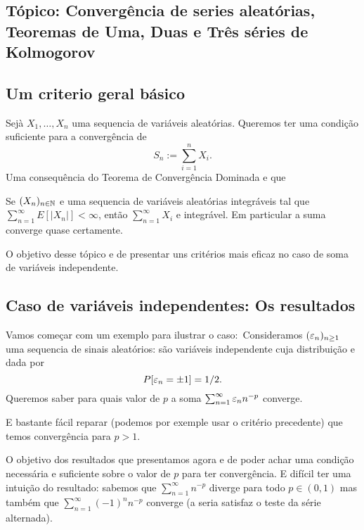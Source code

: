 \newpage
\begin{topics}
\section[Tópico:Séries de Kolmogorov]{Tópico: Convergência de series aleatórias,\\
Teoremas de Uma, Duas e Três séries de Kolmogorov}


\subsection{Um criterio geral básico}

Sejà $X_1,\dots, X_n$ uma sequencia de variáveis aleatórias.
Queremos ter uma condição suficiente para a convergência de 
\begin{equation}
S_n:= \sum_{i=1}^n X_i.
\end{equation}
Uma consequência do Teorema de Convergência Dominada e que 
\begin{lemma}
 Se $(X_n)_{n\in {\ensuremath{\mathbb N}}}$ e uma sequencia de variáveis aleatórias integráveis tal que 
 $\sum_{n=1}^{\infty} E[ |X_n| ]<\infty$,
então $\sum_{n=1}^{\infty} X_i$ e integrável.
Em particular a suma converge quase certamente.
\end{lemma}

O objetivo desse tópico e de presentar uns critérios mais eficaz no caso de soma de variáveis independente.

\medskip

\subsection{Caso de variáveis independentes: Os resultados}

Vamos começar com um exemplo para ilustrar o caso:\
Consideramos $(\varepsilon_n)_{n\ge 1}$ uma sequencia de sinais aleatórios: são variáveis independente cuja distribuição e dada por
$$P[\varepsilon_n=\pm 1]=1/2.$$
Queremos saber para quais valor de $p$ a soma $\sum_{n=1}^{\infty} \varepsilon_n n^{-p}$ converge.

\medskip

E bastante fácil reparar (podemos por exemple usar o critério precedente) que temos convergência para $p>1$.

\medskip

O objetivo dos resultados que presentamos agora e de poder achar uma condição necessária e suficiente sobre o valor de $p$ para ter convergência.
E difícil ter uma intuição do resultado: sabemos que  $\sum_{n=1}^{\infty} n^{-p}$ diverge para todo $p\in (0,1)$ mas também que 
$\sum_{n=1}^{\infty}(-1)^n n^{-p}$ converge (a seria satisfaz o teste da série alternada). 


\end{topics}

